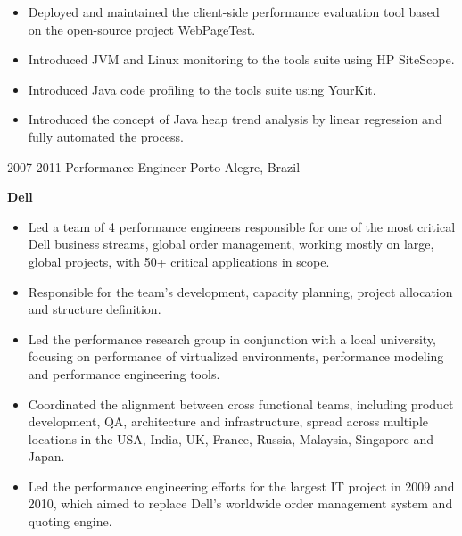 \begin{entrylist}
{\begin{itemize}
        \item Deployed and maintained the client-side performance evaluation tool based on the open-source project WebPageTest.
        \item Introduced JVM and Linux monitoring to the tools suite using HP SiteScope.
        \item Introduced Java code profiling to the tools suite using YourKit.
        \item Introduced the concept of Java heap trend analysis by linear regression and fully automated the process.
      \end{itemize}
    }
  \entry
    {2007-2011}
    {Performance Engineer}
    {Porto Alegre, Brazil}
    {
      \textbf{Dell}
      \begin{itemize}
        \item Led a team of 4 performance engineers responsible for one of the most critical Dell business streams, global order management, working mostly on large, global projects, with 50+ critical applications in scope.
        \item Responsible for the team's development, capacity planning, project allocation and structure definition.
        \item Led the performance research group in conjunction with a local university, focusing on performance of virtualized environments, performance modeling and performance engineering tools.
        \item Coordinated the alignment between cross functional teams, including product development, QA, architecture and infrastructure, spread across multiple locations in the USA, India, UK, France, Russia, Malaysia, Singapore and Japan.
        \item Led the performance engineering efforts for the largest IT project in 2009 and 2010, which aimed to replace Dell's worldwide order management system and quoting engine.
      \end{itemize}
    }
\end{entrylist}
